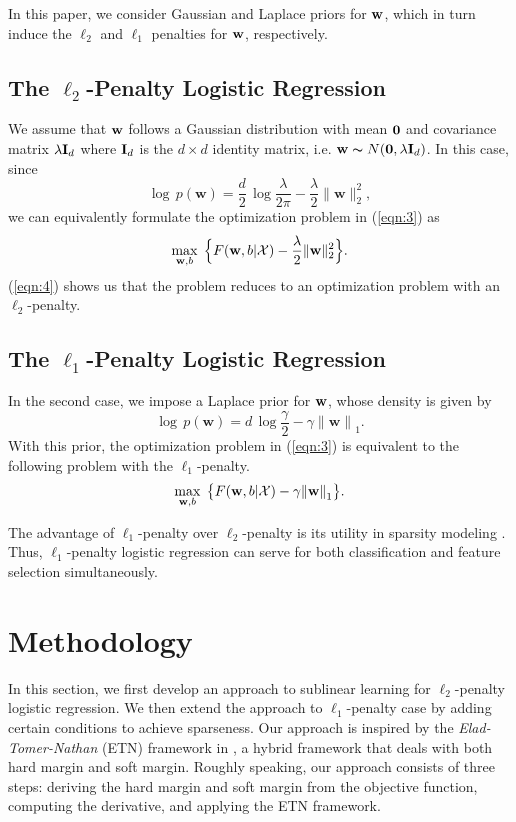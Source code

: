\documentclass{llncs}
\newcommand{\bw}{\mathbf{w}}
\newcommand{\lc}{\left(}
\newcommand{\rc}{\right)}
\def\I{{\bf I}}
\def\w{{\bf w}}
\def\0{{\bf 0}}
\def\XM{{\mathcal X}}
\begin{document}
In this paper, we consider Gaussian and Laplace priors for $\w$, which in turn induce the $\ell_2$ and $\ell_1$ penalties for $\w$, respectively.
	
\subsection{The $\ell_2$-Penalty Logistic Regression}
	
We assume that $\w$ follows a Gaussian distribution with mean $\0$ and covariance matrix $\lambda \I_d$ where $\I_d$ is the $d{\times}d$ identity matrix, i.e. $\w \thicksim N(\0, \lambda \I_d)$. In this case, since	
\[
	\log\, p(\bw) =\frac{d}{2}\,\log {\frac{\lambda}{2\pi}}-\frac{\lambda}{2} \|\bw \|_2^{2},
\]
we can equivalently formulate the optimization problem in (\ref{eqn:3}) as
\begin{equation} \label{eqn:4}
	\max_{\bw ,b} \; \Big\{F(\w, b| \XM) - \frac{\lambda}{2}  \|\bw\|_2^{2} \Big\}.
\end{equation}
(\ref{eqn:4}) shows us that the problem reduces to an optimization problem with an $\ell_2$-penalty.
	
\subsection{The $\ell_1$-Penalty Logistic Regression}
	
In the second case, we impose a Laplace prior for $\w$, whose density is given by
\[	
\log\,p\lc\bw \rc=d\,\log\frac{\gamma}{2}-\gamma{\|\bw\|}_{1}.
\]
With this prior, the optimization problem in (\ref{eqn:3}) is equivalent to the following problem with the $\ell_1$-penalty.
\begin{equation} \label{eqn:5}
	\max_{\bw ,b} \;  \big\{F(\w, b|\XM)- \gamma{\|\bw \|}_{1}\big\}.	
\end{equation}

The advantage of $\ell_1$-penalty over $\ell_2$-penalty is its utility in sparsity modeling \cite{tibshirani1996regression} .
Thus, $\ell_1$-penalty logistic regression can serve for both classification and feature selection simultaneously.
	
\section{Methodology} \label{sec:framework}
	
In this section, we first develop an approach to sublinear learning for $\ell_2$-penalty logistic regression.
We then extend the approach to $\ell_1$-penalty case by adding certain conditions to achieve sparseness.
Our approach is inspired by the \textit{Elad-Tomer-Nathan} (ETN) framework in \cite{hazanbeating}, a hybrid framework that deals with both hard margin and soft margin.
Roughly speaking, our approach consists of three steps: deriving the hard margin and soft margin from the objective function, computing the derivative, and applying the ETN framework.
\end{document}
